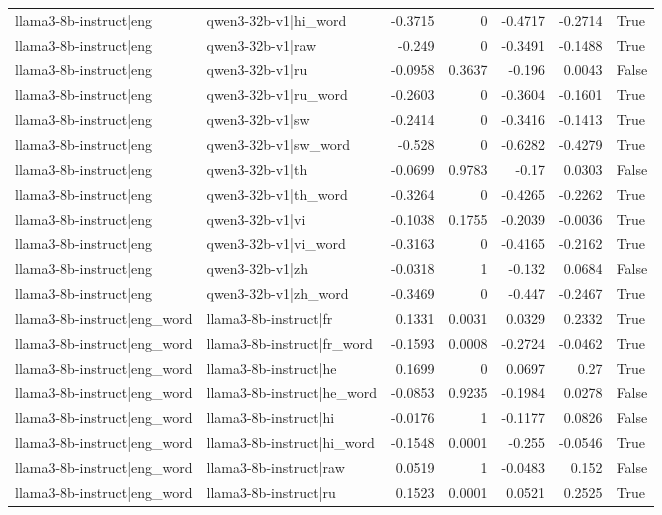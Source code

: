 \begin{table}
\begin{tabular}{l l r r r r l}
llama3-8b-instruct|eng & qwen3-32b-v1|hi_word & -0.3715 & 0 & -0.4717 & -0.2714 & True \\
llama3-8b-instruct|eng & qwen3-32b-v1|raw & -0.249 & 0 & -0.3491 & -0.1488 & True \\
llama3-8b-instruct|eng & qwen3-32b-v1|ru & -0.0958 & 0.3637 & -0.196 & 0.0043 & False \\
llama3-8b-instruct|eng & qwen3-32b-v1|ru_word & -0.2603 & 0 & -0.3604 & -0.1601 & True \\
llama3-8b-instruct|eng & qwen3-32b-v1|sw & -0.2414 & 0 & -0.3416 & -0.1413 & True \\
llama3-8b-instruct|eng & qwen3-32b-v1|sw_word & -0.528 & 0 & -0.6282 & -0.4279 & True \\
llama3-8b-instruct|eng & qwen3-32b-v1|th & -0.0699 & 0.9783 & -0.17 & 0.0303 & False \\
llama3-8b-instruct|eng & qwen3-32b-v1|th_word & -0.3264 & 0 & -0.4265 & -0.2262 & True \\
llama3-8b-instruct|eng & qwen3-32b-v1|vi & -0.1038 & 0.1755 & -0.2039 & -0.0036 & True \\
llama3-8b-instruct|eng & qwen3-32b-v1|vi_word & -0.3163 & 0 & -0.4165 & -0.2162 & True \\
llama3-8b-instruct|eng & qwen3-32b-v1|zh & -0.0318 & 1 & -0.132 & 0.0684 & False \\
llama3-8b-instruct|eng & qwen3-32b-v1|zh_word & -0.3469 & 0 & -0.447 & -0.2467 & True \\
llama3-8b-instruct|eng_word & llama3-8b-instruct|fr & 0.1331 & 0.0031 & 0.0329 & 0.2332 & True \\
llama3-8b-instruct|eng_word & llama3-8b-instruct|fr_word & -0.1593 & 0.0008 & -0.2724 & -0.0462 & True \\
llama3-8b-instruct|eng_word & llama3-8b-instruct|he & 0.1699 & 0 & 0.0697 & 0.27 & True \\
llama3-8b-instruct|eng_word & llama3-8b-instruct|he_word & -0.0853 & 0.9235 & -0.1984 & 0.0278 & False \\
llama3-8b-instruct|eng_word & llama3-8b-instruct|hi & -0.0176 & 1 & -0.1177 & 0.0826 & False \\
llama3-8b-instruct|eng_word & llama3-8b-instruct|hi_word & -0.1548 & 0.0001 & -0.255 & -0.0546 & True \\
llama3-8b-instruct|eng_word & llama3-8b-instruct|raw & 0.0519 & 1 & -0.0483 & 0.152 & False \\
llama3-8b-instruct|eng_word & llama3-8b-instruct|ru & 0.1523 & 0.0001 & 0.0521 & 0.2525 & True \\

\end{tabular}
\end{table}

